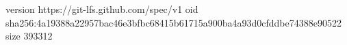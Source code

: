 version https://git-lfs.github.com/spec/v1
oid sha256:4a19388a22957bac46e3bfbc68415b61715a900ba4a93d0cfddbe74388e90522
size 393312

